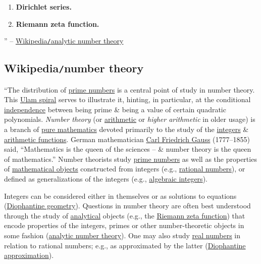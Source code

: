 \documentclass{article}
\begin{document}
\begin{enumerate}
	\item {\bf Dirichlet series.}
	\item {\bf Riemann zeta function.}
\end{enumerate}

'' -- \href{https://en.wikipedia.org/wiki/Analytic_number_theory}{Wikipedia{\tt/}analytic number theory}


\subsection{Wikipedia{\tt/}number theory}
``{\sf The distribution of \href{https://en.wikipedia.org/wiki/Prime_number}{prime numbers} is a central point of study in number theory. This \href{https://en.wikipedia.org/wiki/Ulam_spiral}{Ulam spiral} serves to illustrate it, hinting, in particular, at the conditional \href{https://en.wikipedia.org/wiki/Independence_(probability_theory)}{independence} between being prime \& being a value of certain quadratic polynomials.} {\it Number theory} (or \href{https://en.wikipedia.org/wiki/Arithmetic}{arithmetic} or {\it higher arithmetic} in older usage) is a branch of \href{https://en.wikipedia.org/wiki/Pure_mathematics}{pure mathematics} devoted primarily to the study of the \href{https://en.wikipedia.org/wiki/Integer}{integers} \& \href{https://en.wikipedia.org/wiki/Arithmetic_function}{arithmetic functions}. German mathematician \href{https://en.wikipedia.org/wiki/Carl_Friedrich_Gauss}{\sc Carl Friedrich Gauss} (1777--1855) said, ``Mathematics is the queen of the sciences -- \& number theory is the queen of mathematics.'' Number theorists study \href{https://en.wikipedia.org/wiki/Prime_number}{prime numbers} as well as the properties of \href{https://en.wikipedia.org/wiki/Mathematical_object}{mathematical objects} constructed from integers (e.g., \href{https://en.wikipedia.org/wiki/Rational_number}{rational numbers}), or defined as generalizations of the integers (e.g., \href{https://en.wikipedia.org/wiki/Algebraic_integer}{algebraic integers}).

Integers can be considered either in themselves or as solutions to equations (\href{https://en.wikipedia.org/wiki/Diophantine_geometry}{Diophantine geometry}). Questions in number theory are often best understood through the study of \href{https://en.wikipedia.org/wiki/Complex_analysis}{analytical} objects (e.g., the \href{https://en.wikipedia.org/wiki/Riemann_zeta_function}{Riemann zeta function}) that encode properties of the integers, primes or other number-theoretic objects in some fashion (\href{https://en.wikipedia.org/wiki/Analytic_number_theory}{analytic number theory}). One may also study \href{https://en.wikipedia.org/wiki/Real_number}{real numbers} in relation to rational numbers; e.g., as approximated by the latter (\href{https://en.wikipedia.org/wiki/Diophantine_approximation}{Diophantine approximation}).
\end{document}
